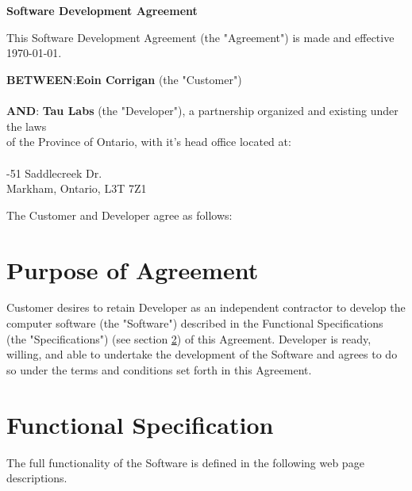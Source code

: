 \documentclass[11pt]{article}
\begin{document}

\newpage
\newpage
\section*{}
\begin{center}
{\bf \LARGE Software Development Agreement} 
\end{center}
\setlength{\parskip}{24pt} %
This Software Development Agreement (the "Agreement") is made and effective {\today}.
\setlength{\parskip}{6pt} %
\begin{tabbing}
{\bf BETWEEN}:\hspace{0.2in}\={\bf Eoin Corrigan} (the "Customer") \\
\> \\
{\bf AND}:\> {\bf Tau Labs } (the "Developer"), a partnership organized and existing under the laws \\
\>of the Province of Ontario, with it's head office located at: \\
\> \\
-51 Saddlecreek Dr. \\
\> Markham, Ontario,  L3T 7Z1 \\
\end{tabbing}
The Customer and Developer agree as follows:
\section{Purpose of Agreement}
Customer desires to retain Developer as an independent contractor to develop the computer software (the "Software") described in the Functional Specifications (the "Specifications") (see section \ref{sec:functional_spec}) of this Agreement. Developer is ready, willing, and able to undertake the development of the Software and agrees to do so under the terms and conditions set forth in this Agreement.
\section{Functional Specification}
\label{sec:functional_spec}
The full functionality of the Software is defined in the following web page descriptions.
\end{document}
